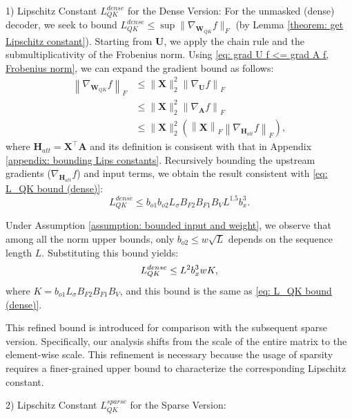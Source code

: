 \documentclass[lettersize,onecolumn]{IEEEtran}
\begin{document}
1) Lipschitz Constant $L_{QK}^{dense}$ for the Dense Version: For the unmasked (dense) decoder, we seek to bound $L_{QK}^{dense}\leq \sup \|\nabla_{\mathbf{W}_{QK}} f\|_F$ (by Lemma \ref{theorem: get Lipschitz constant}). Starting from $\mathbf{U}$, we apply the chain rule and the submultiplicativity of the Frobenius norm. Using \eqref{eq: grad U f <= grad A f, Frobenius norm}, we can expand the gradient bound as follows:
\begin{equation}
    \begin{aligned}
\left\|\nabla_{\mathbf{W}_{Q K}} f\right\|_{F} & \leq\|\mathbf{X}\|_{2}^{2}\left\|\nabla_{\mathbf{U}} f\right\|_{F} \\
& \leq\|\mathbf{X}\|_{2}^{2}\left\|\nabla_{\mathbf{A}} f\right\|_{F} \\
& \leq\|\mathbf{X}\|_{2}^{2}\left(\left\|\mathbf{X}\right\|_{F}\left\|\nabla_{\mathbf{H}_{att}} f\right\|_{F}\right),
\end{aligned}
\end{equation}
where $\mathbf{H}_{att}=\mathbf{X}^{\top}\mathbf{A}$ and its definition is consisent with that in Appendix \ref{appendix: bounding Lips constants}. Recursively bounding the upstream gradients ($\nabla_{\mathbf{H}_{att}}f$) and input terms, we obtain the result consistent with \eqref{eq: L_QK bound (dense)}:
\begin{equation}
    L_{QK}^{dense} \leq b_{o1}b_{o2} L_{\sigma} B_{F 2} B_{F 1} B_{V} L^{1.5} b_{x}^{3}.
\end{equation}

Under Assumption \ref{assumption: bounded input and weight}, we observe that among all the norm upper bounds, only $b_{o2}\leq w\sqrt{L}$ depends on the sequence length $L$. Substituting this bound yields:
\begin{equation}
    L_{QK}^{dense} \leq L^2 b_{x}^{3}wK,
    \label{eq: L_{QK} (dense, using w)}
\end{equation}
where $K=b_{o1} L_{\sigma} B_{F 2} B_{F 1} B_{V}$, and this bound is the same as \eqref{eq: L_QK bound (dense)}.

This refined bound is introduced for comparison with the subsequent sparse version. Specifically, our analysis shifts from the scale of the entire matrix to the element-wise scale. This refinement is necessary because the usage of sparsity requires a finer-grained upper bound to characterize the corresponding Lipschitz constant.

2) Lipschitz Constant $L_{QK}^{sparse}$ for the Sparse Version: 
\end{document}
